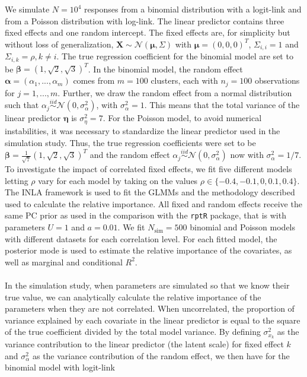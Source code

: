 We simulate $N=10^4$ responses from a binomial distribution with a logit-link and from a Poisson distribution with log-link. The linear predictor contains three fixed effects and one random intercept. The fixed effects are, for simplicity but without loss of generalization, $\mathbf{X} \sim \mathcal{N}(\boldsymbol{\mu}, \Sigma)$ with $\boldsymbol{\mu} = (0, 0, 0)^T$, $\Sigma_{i, i} = 1$ and $\Sigma_{i, k} = \rho, k \neq i$. The true regression coefficient for the binomial model are set to be $\boldsymbol{\beta}=(1, \sqrt{2}, \sqrt{3})^T$. In the binomial model, the random effect $\boldsymbol{\alpha}=(\alpha_1, ..., \alpha_m)$ comes from $m=100$ clusters, each with $n_j=100$ observations for $j=1, ..., m$. Further, we draw the random effect from a normal distribution such that $\alpha_j \stackrel{iid}{\sim} \mathcal{N}(0, \sigma^2_{\alpha})$, with $\sigma^2_{\alpha}=1$. This means that the total variance of the linear predictor $\boldsymbol{\eta}$ is $\sigma_{\eta}^2=7$. For the Poisson model, to avoid numerical instabilities, it was necessary to standardize the linear predictor used in the simulation study. Thus, the true regression coefficients were set to be $\boldsymbol{\beta}=\frac{1}{\sqrt{7}}(1, \sqrt{2}, \sqrt{3})^T$ and the random effect $\alpha_j \stackrel{iid}{\sim} \mathcal{N}(0, \sigma^2_{\alpha})$ now with $\sigma^2_{\alpha}=1/7$. To investigate the impact of correlated fixed effects, we fit five different models letting $\rho$ vary for each model by taking on the values $\rho \in \{-0.4, -0.1, 0, 0.1, 0.4\}$. The INLA framework is used to fit the GLMMs and the methodology described used to calculate the relative importance. All fixed and random effects receive the same PC prior as used in the comparison with the \texttt{rptR} package, that is with parameters $U=1$ and $a=0.01$. We fit $N_{\text{sim}}=500$ binomial and Poisson models with different datasets for each correlation level. For each fitted model, the posterior mode is used to estimate the relative importance of the covariates, as well as marginal and conditional $R^2$.
\\
\\
In the simulation study, when parameters are simulated so that we know their true value, we can analytically calculate the relative importance of the parameters when they are not correlated. When uncorrelated, the proportion of variance explained by each covariate in the linear predictor is equal to the square of the true coefficient divided by the total model variance. By defining $\sigma_{x_k}^2$ as the variance contribution to the linear predictor (the latent scale) for fixed effect $k$ and $\sigma^2_{\alpha}$ as the variance contribution of the random effect, we then have for the binomial model with logit-link
